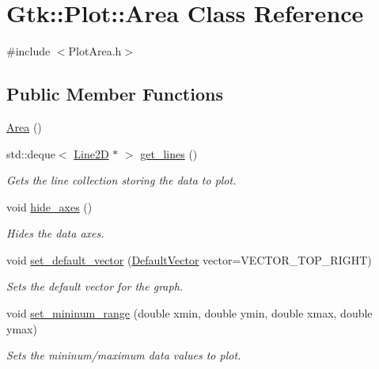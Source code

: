 \hypertarget{classGtk_1_1Plot_1_1Area}{
\section{Gtk::Plot::Area Class Reference}
\label{classGtk_1_1Plot_1_1Area}
}


{\ttfamily \#include $<$PlotArea.h$>$}\subsection*{Public Member Functions}
\begin{DoxyCompactItemize}
\item 
\hyperlink{classGtk_1_1Plot_1_1Area_a0620d8e15c28422e302152fe086436ad}{Area} ()
\item 
std::deque$<$ \hyperlink{classGtk_1_1Plot_1_1Line2D}{Line2D} $\ast$ $>$ \hyperlink{classGtk_1_1Plot_1_1Area_a3d63a496f6d7d604aeae17e7f85beda9}{get\_\-lines} ()
\begin{DoxyCompactList}\small\item\em Gets the line collection storing the data to plot. \item\end{DoxyCompactList}\item 
void \hyperlink{classGtk_1_1Plot_1_1Area_a20070fe099e163edfb8fb6c07526f4c3}{hide\_\-axes} ()
\begin{DoxyCompactList}\small\item\em Hides the data axes. \item\end{DoxyCompactList}\item 
void \hyperlink{classGtk_1_1Plot_1_1Area_a98008d5f8c7cdf2eeaa96f13b2ae55ce}{set\_\-default\_\-vector} (\hyperlink{namespaceGtk_1_1Plot_aa7cadb8fb1ada346afe4e3acce74600d}{DefaultVector} vector=VECTOR\_\-TOP\_\-RIGHT)
\begin{DoxyCompactList}\small\item\em Sets the default vector for the graph. \item\end{DoxyCompactList}\item 
void \hyperlink{classGtk_1_1Plot_1_1Area_aba18121a1816de00d3ab66c7c380e116}{set\_\-mininum\_\-range} (double xmin, double ymin, double xmax, double ymax)
\begin{DoxyCompactList}\small\item\em Sets the mininum/maximum data values to plot. \item\end{DoxyCompactList}\item 

\end{DoxyCompactItemize}
